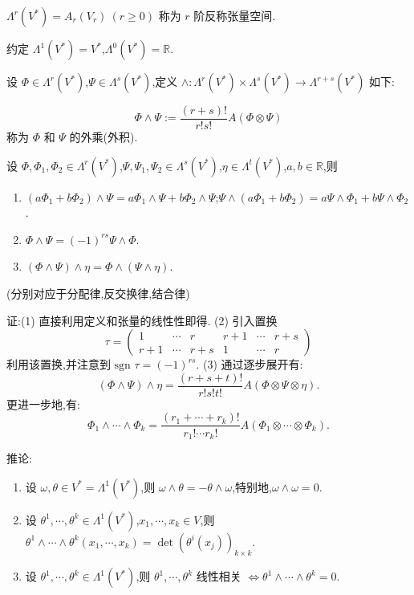 $\Lambda^r(V^*) = A_r(V_r) \ (r \geq 0)$ 称为 $r$ 阶反称张量空间.

约定 $\Lambda^1(V^*) = V^*$,$\Lambda^0(V^*) = \mathbb{R}$.

设 $\Phi \in \Lambda^r(V^*)$,$\Psi \in \Lambda^s(V^*)$,定义 $\wedge : \Lambda^r(V^*) \times \Lambda^s(V^*) \to \Lambda^{r+s}(V^*)$ 如下:

\[
\Phi \wedge \Psi := \frac{(r + s)!}{r!s!} A(\Phi \otimes \Psi)
\]
称为 $\Phi$ 和 $\Psi$ 的外乘(外积).

\begin{theorem}
设 $\Phi, \Phi_1, \Phi_2 \in \Lambda^r(V^*)$,$\Psi, \Psi_1, \Psi_2 \in \Lambda^s(V^*)$,$\eta \in \Lambda^t(V^*)$,$a, b \in \mathbb{R}$,则
\begin{enumerate}
    \item $(a \Phi_1 + b \Phi_2) \wedge \Psi = a \Phi_1 \wedge \Psi + b \Phi_2 \wedge \Psi$;$\Psi \wedge (a \Phi_1 + b \Phi_2) = a \Psi \wedge \Phi_1 + b \Psi \wedge \Phi_2$.
    \item $\Phi \wedge \Psi = (-1)^{rs} \Psi \wedge \Phi$.
    \item $(\Phi \wedge \Psi) \wedge \eta = \Phi \wedge (\Psi \wedge \eta)$.
\end{enumerate}
(分别对应于分配律,反交换律,结合律)
\end{theorem}

证:(1) 直接利用定义和张量的线性性即得.
(2) 引入置换
\[
\tau = \begin{pmatrix}
1 & \cdots & r & r+1 & \cdots & r+s \\
r+1 & \cdots & r+s & 1 & \cdots & r
\end{pmatrix}
\]
利用该置换,并注意到 $\text{sgn }\tau = (-1)^{rs}$.
(3) 通过逐步展开有:
\[
(\Phi \land \Psi) \land \eta = \frac{(r+s+t)!}{r!s!t!} A(\Phi \otimes \Psi \otimes \eta).
\]
更进一步地,有:
\[
\Phi_1 \land \cdots \land \Phi_k = \frac{(r_1 + \cdots + r_k)!}{r_1! \cdots r_k!} A(\Phi_1 \otimes \cdots \otimes \Phi_k).
\]

推论:
\begin{enumerate}
    \item 设 $\omega, \theta \in V^* = \Lambda^1(V^*)$,则 $\omega \land \theta = -\theta \land \omega$,特别地,$\omega \land \omega = 0$.
    \item 设 $\theta^1, \cdots, \theta^k \in \Lambda^1(V^*)$,$x_1, \cdots, x_k \in V$,则 $\theta^1 \land \cdots \land \theta^k (x_1, \cdots, x_k) = \det(\theta^i(x_j))_{k \times k}$.
    \item 设 $\theta^1, \cdots, \theta^k \in \Lambda^1(V^*)$,则 $\theta^1, \cdots, \theta^k$ 线性相关 $\iff \theta^1 \land \cdots \land \theta^k = 0$.
\end{enumerate}

